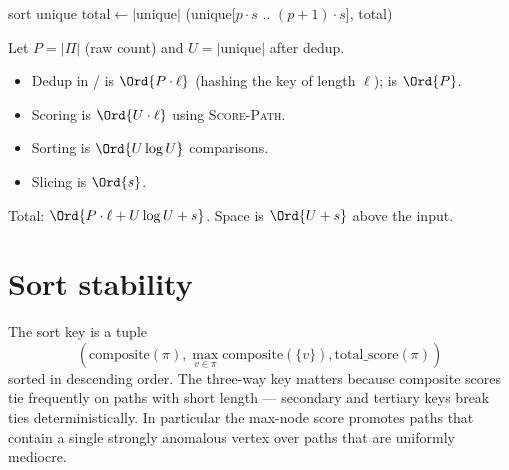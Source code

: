 \begin{algorithm}
\caption{\textsc{Score-And-Paginate}}\label{alg:score-paginate}
sort unique\;
$\text{total} \gets |\text{unique}|$\;
\Return (unique[$p \cdot s$ .. $(p+1) \cdot s$], total)\;
\end{algorithm}

\begin{complexity}
Let $P = |\Pi|$ (raw count) and $U = |\text{unique}|$ after dedup.
\begin{itemize}
    \item Dedup in / is
        $\Ord{P \cdot \ell}$ (hashing the key of length $\ell$);
         is $\Ord{P}$.
    \item Scoring is $\Ord{U \cdot \ell}$ using \textsc{Score-Path}.
    \item Sorting is $\Ord{U \log U}$ comparisons.
    \item Slicing is $\Ord{s}$.
\end{itemize}
Total: $\Ord{P \cdot \ell + U \log U + s}$. Space is $\Ord{U + s}$
above the input.
\end{complexity}

\section{Sort stability}

The sort key is a tuple
\[
    (\mathrm{composite}(\pi), \max_{v \in \pi}\mathrm{composite}(\{v\}),
     \mathrm{total\_score}(\pi))
\]
sorted in descending order. The three-way key matters because
composite scores tie frequently on paths with short length ---
secondary and tertiary keys break ties deterministically. In
particular the max-node score promotes paths that contain a
single strongly anomalous vertex over paths that are uniformly
mediocre.

